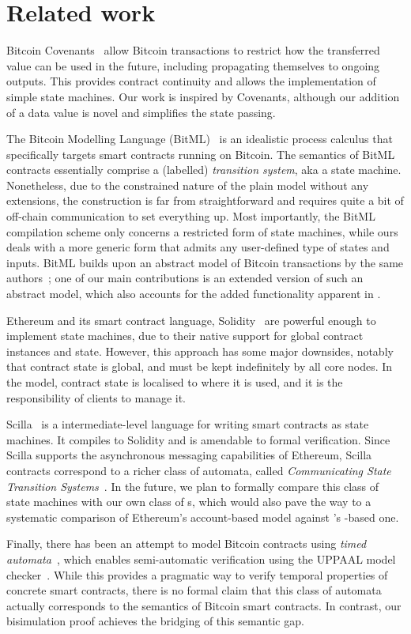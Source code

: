 \section{Related work}
\label{sec:related}

Bitcoin Covenants~\cite{moser2016bitcoin} allow Bitcoin transactions to
restrict how the transferred value can be used in the future, including propagating
themselves to ongoing outputs. This provides contract continuity and allows the
implementation of simple state machines. Our work is inspired by Covenants, although
our addition of a data value is novel and simplifies the state passing.

The Bitcoin Modelling Language (BitML)~\cite{bitml} is an idealistic process calculus
that specifically targets smart contracts running on Bitcoin.
The semantics of BitML contracts essentially comprise a (labelled) \textit{transition system}, aka a state machine.
Nonetheless, due to the constrained nature of the plain \UTXO{} model without any extensions,
the construction is far from straightforward and requires quite a bit of off-chain communication to set everything up.
Most importantly, the BitML compilation scheme only concerns a restricted form of state machines,
while ours deals with a more generic form that admits any user-defined type of states and inputs.
BitML builds upon an abstract model of Bitcoin transactions by the same
authors~\cite{formal-model-of-bitcoin-transactions};
one of our main contributions is an extended version of such an abstract model,
which also accounts for the added functionality apparent in \Cardano{}.

Ethereum and its smart contract language, Solidity~\cite{Solidity} are powerful
enough to implement state machines, due to their native support for
global contract instances and state. However, this approach has some major downsides,
notably that contract state is global, and must be kept indefinitely by all core nodes.
In the \EUTXO{} model, contract state is localised to where it is used, and
it is the responsibility of clients to manage it.

Scilla~\cite{scilla} is a intermediate-level language for writing smart
contracts as state machines. It compiles to Solidity and is amendable to formal verification.
Since Scilla supports the asynchronous messaging capabilities of Ethereum,
Scilla contracts correspond to a richer class of automata, called
\textit{Communicating State Transition Systems}~\cite{csta}.
In the future, we plan to formally compare this class of state machines with our own class of \CEM{}s,
which would also pave the way to a systematic comparison of Ethereum's account-based model against \Cardano{}'s \UTXO{}-based one.

Finally, there has been an attempt to model Bitcoin contracts using \textit{timed automata}~\cite{timed-btc},
which enables semi-automatic verification using the UPPAAL model checker~\cite{uppaal}.
While this provides a pragmatic way to verify temporal properties of concrete smart contracts,
there is no formal claim that this class of automata actually corresponds to the semantics of Bitcoin smart contracts.
In contrast, our bisimulation proof achieves the bridging of this semantic gap.
